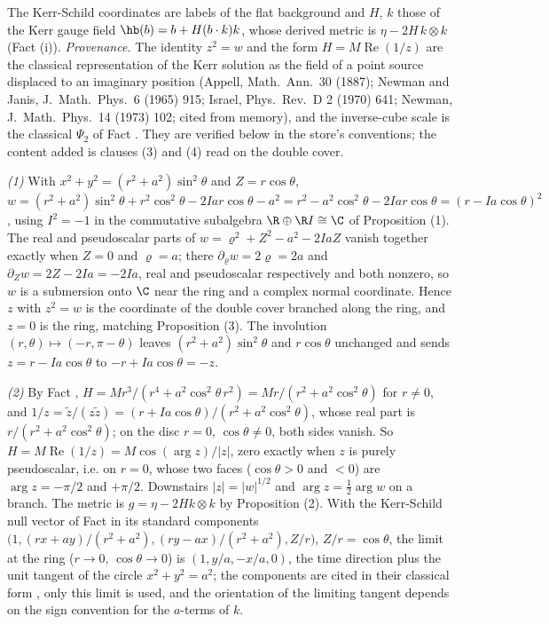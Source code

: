 The Kerr-Schild coordinates are labels of the flat background and $H$, $k$ those of the Kerr gauge field $\hb(b) = b + H(b \cdot k)k$, whose derived metric is $\eta - 2H\,k \otimes k$ (Fact (i)). \emph{Provenance.} The identity $z^2 = w$ and the form $H = M\operatorname{Re}(1/z)$ are the classical representation of the Kerr solution as the field of a point source displaced to an imaginary position (Appell, Math.\ Ann.\ 30 (1887); Newman and Janis, J.\ Math.\ Phys.\ 6 (1965) 915; Israel, Phys.\ Rev.\ D 2 (1970) 641; Newman, J.\ Math.\ Phys.\ 14 (1973) 102; cited from memory), and the inverse-cube scale is the classical $\Psi_2$ of Fact . They are verified below in the store's conventions; the content added is clauses (3) and (4) read on the double cover.

\emph{(1)} With $x^2 + y^2 = (r^2 + a^2)\sin^2\theta$ and $Z = r\cos\theta$, $w = (r^2 + a^2)\sin^2\theta + r^2\cos^2\theta - 2Iar\cos\theta - a^2 = r^2 - a^2\cos^2\theta - 2Iar\cos\theta = (r - Ia\cos\theta)^2$, using $I^2 = -1$ in the commutative subalgebra $\R \oplus \R I \cong \C$ of Proposition (1). The real and pseudoscalar parts of $w = \varrho^2 + Z^2 - a^2 - 2IaZ$ vanish together exactly when $Z = 0$ and $\varrho = a$; there $\partial_\varrho w = 2\varrho = 2a$ and $\partial_Z w = 2Z - 2Ia = -2Ia$, real and pseudoscalar respectively and both nonzero, so $w$ is a submersion onto $\C$ near the ring and a complex normal coordinate. Hence $z$ with $z^2 = w$ is the coordinate of the double cover branched along the ring, and $z = 0$ is the ring, matching Proposition (3). The involution $(r, \theta) \mapsto (-r, \pi - \theta)$ leaves $(r^2 + a^2)\sin^2\theta$ and $r\cos\theta$ unchanged and sends $z = r - Ia\cos\theta$ to $-r + Ia\cos\theta = -z$.

\emph{(2)} By Fact , $H = Mr^3/(r^4 + a^2\cos^2\theta\,r^2) = Mr/(r^2 + a^2\cos^2\theta)$ for $r \neq 0$, and $1/z = \tilde z/(z\tilde z) = (r + Ia\cos\theta)/(r^2 + a^2\cos^2\theta)$, whose real part is $r/(r^2 + a^2\cos^2\theta)$; on the disc $r = 0$, $\cos\theta \neq 0$, both sides vanish. So $H = M\operatorname{Re}(1/z) = M\cos(\arg z)/|z|$, zero exactly when $z$ is purely pseudoscalar, i.e. on $r = 0$, whose two faces ($\cos\theta > 0$ and $< 0$) are $\arg z = -\pi/2$ and $+\pi/2$. Downstairs $|z| = |w|^{1/2}$ and $\arg z = \tfrac12\arg w$ on a branch. The metric is $g = \eta - 2Hk\otimes k$ by Proposition (2). With the Kerr-Schild null vector of Fact  in its standard components $\bigl(1, (rx + ay)/(r^2 + a^2), (ry - ax)/(r^2 + a^2), Z/r\bigr)$, $Z/r = \cos\theta$, the limit at the ring ($r \to 0$, $\cos\theta \to 0$) is $(1, y/a, -x/a, 0)$, the time direction plus the unit tangent of the circle $x^2 + y^2 = a^2$; the components are cited in their classical form \cite{KerrSchild1965}, only this limit is used, and the orientation of the limiting tangent depends on the sign convention for the $a$-terms of $k$.

